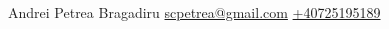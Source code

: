\documentclass[lighthipster]{simplehipstercv}
\newlength{\rightcolwidth}
\begin{document}
\begin{paracol}{2}
 
 
 
 
 
 
 
 
 
 
 
 
 
\setlength{\parindent}{0pt}
\begin{minipage}[t]{\rightcolwidth}
\begin{center}\fontfamily{\sfdefault}\selectfont \color{black!70}
{\small Andrei Petrea  Bragadiru   \href{mailto:scpetrea@gmail.com}{\protect\url{scpetrea@gmail.com}}  \href{tel:+40725195189}{+40725195189}
}
\end{center}
\end{minipage}
 
\end{paracol}
 
\end{document}
